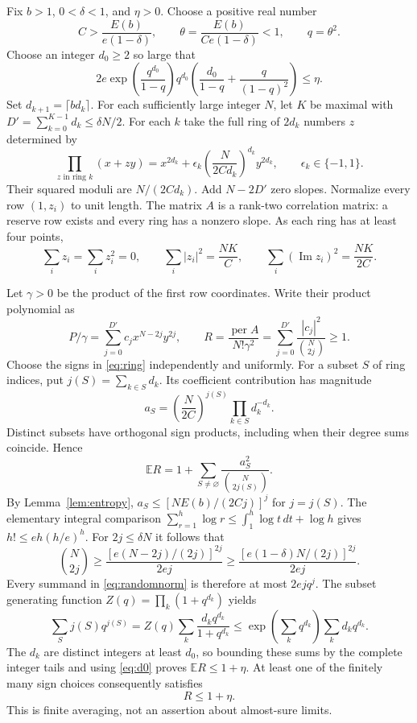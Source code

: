\documentclass[11pt]{article}
\DeclareMathOperator{\per}{per}
\DeclareMathOperator{\Imm}{Im}
\begin{document}
Fix $b>1$, $0<\delta<1$, and $\eta>0$. Choose a positive real number
\[
 C>\frac{E(b)}{e(1-\delta)},\qquad
 \theta=\frac{E(b)}{Ce(1-\delta)}<1,\qquad q=\theta^2.
\]
Choose an integer $d_0\ge2$ so large that
\begin{equation}\label{eq:d0}
 2e\exp\!\left(\frac{q^{d_0}}{1-q}\right)q^{d_0}
 \left(\frac{d_0}{1-q}+\frac{q}{(1-q)^2}\right)\le\eta.
\end{equation}
Set $d_{k+1}=\lceil bd_k\rceil$. For each sufficiently large integer $N$, let
$K$ be maximal with $D'=\sum_{k=0}^{K-1}d_k\le\delta N/2$.
For each $k$ take the full ring of $2d_k$ numbers $z$ determined by
\begin{equation}\label{eq:ring}
 \prod_{z\text{ in ring }k}(x+zy)
 =x^{2d_k}+\epsilon_k\left(\frac{N}{2Cd_k}\right)^{d_k}y^{2d_k},
 \qquad \epsilon_k\in\{-1,1\}.
\end{equation}
Their squared moduli are $N/(2Cd_k)$. Add $N-2D'$ zero slopes.
Normalize every row $(1,z_i)$ to unit length. The matrix $A$ is a rank-two correlation
matrix: a reserve row exists and every ring has a nonzero slope. As each ring
has at least four points,
\begin{equation}\label{eq:slopes}
 \sum_i z_i=\sum_i z_i^2=0,
 \qquad \sum_i|z_i|^2=\frac{NK}{C},
 \qquad \sum_i(\Imm z_i)^2=\frac{NK}{2C}.
\end{equation}

Let $\gamma>0$ be the product of the first row coordinates. Write their product
polynomial as
\[
 P/\gamma=\sum_{j=0}^{D'}c_jx^{N-2j}y^{2j},\qquad
 R=\frac{\per A}{N!\gamma^2}
   =\sum_{j=0}^{D'}\frac{|c_j|^2}{\binom N{2j}}\ge1.
\]
Choose the signs in \eqref{eq:ring} independently and uniformly. For a subset
$S$ of ring indices, put $j(S)=\sum_{k\in S}d_k$. Its coefficient contribution
has magnitude
\[
 a_S=\left(\frac{N}{2C}\right)^{j(S)}
           \prod_{k\in S}d_k^{-d_k}.
\]
Distinct subsets have orthogonal sign products, including when their degree
sums coincide. Hence
\begin{equation}\label{eq:randomnorm}
 \mathbb ER=1+\sum_{S\ne\varnothing}
          \frac{a_S^2}{\binom N{2j(S)}}.
\end{equation}
By Lemma~\ref{lem:entropy}, $a_S\le[NE(b)/(2Cj)]^j$ for $j=j(S)$.
The elementary integral comparison
$\sum_{r=1}^h\log r\le\int_1^h\log t\,dt+\log h$ gives
$h!\le eh(h/e)^h$. For $2j\le\delta N$ it follows that
\[
 \binom N{2j}\ge\frac{[e(N-2j)/(2j)]^{2j}}{2ej}
 \ge\frac{[e(1-\delta)N/(2j)]^{2j}}{2ej}.
\]
Every summand in \eqref{eq:randomnorm} is therefore at most $2ejq^j$.
The subset generating function $Z(q)=\prod_k(1+q^{d_k})$ yields
\[
 \sum_Sj(S)q^{j(S)}
 =Z(q)\sum_k\frac{d_kq^{d_k}}{1+q^{d_k}}
 \le\exp\!\left(\sum_kq^{d_k}\right)\sum_kd_kq^{d_k}.
\]
The $d_k$ are distinct integers at least $d_0$, so bounding these sums by the
complete integer tails and using \eqref{eq:d0} proves $\mathbb ER\le1+\eta$.
At least one of the finitely many sign choices consequently satisfies
\begin{equation}\label{eq:Rsmall}
 R\le1+\eta.
\end{equation}
This is finite averaging, not an assertion about almost-sure limits.
\end{document}
